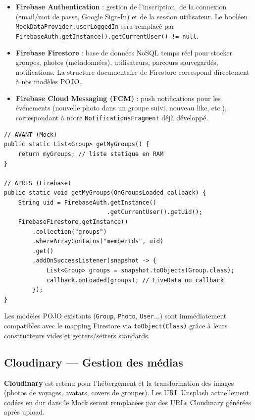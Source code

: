\documentclass[a4paper,11pt]{article}
\newenvironment{codeblock}{
    \par\noindent\minipage{\linewidth}\vspace{4pt}
}{
    \vspace{4pt}\endminipage\par
}
\begin{document}
\begin{itemize}[leftmargin=1.5em, itemsep=3pt]
    \item \textbf{Firebase Authentication} : gestion de l'inscription, de la connexion (email/mot de passe, Google Sign-In) et de la session utilisateur. Le booléen \texttt{MockDataProvider.userLoggedIn} sera remplacé par \texttt{FirebaseAuth.getInstance().getCurrentUser() != null}.
    \item \textbf{Firebase Firestore} : base de données NoSQL temps réel pour stocker groupes, photos (métadonnées), utilisateurs, parcours sauvegardés, notifications. La structure documentaire de Firestore correspond directement à nos modèles POJO.
    \item \textbf{Firebase Cloud Messaging (FCM)} : push notifications pour les événements (nouvelle photo dans un groupe suivi, nouveau like, etc.), correspondant à notre \texttt{NotificationsFragment} déjà développé.
\end{itemize}

\begin{codeblock}
\begin{lstlisting}[caption={Migration exemple — getMyGroups() vers Firestore}]
// AVANT (Mock)
public static List<Group> getMyGroups() {
    return myGroups; // liste statique en RAM
}

// APRES (Firebase)
public static void getMyGroups(OnGroupsLoaded callback) {
    String uid = FirebaseAuth.getInstance()
                             .getCurrentUser().getUid();
    FirebaseFirestore.getInstance()
        .collection("groups")
        .whereArrayContains("memberIds", uid)
        .get()
        .addOnSuccessListener(snapshot -> {
            List<Group> groups = snapshot.toObjects(Group.class);
            callback.onLoaded(groups); // LiveData ou callback
        });
}
\end{lstlisting}
\end{codeblock}

\noindent Les modèles POJO existants (\texttt{Group}, \texttt{Photo}, \texttt{User}...) sont immédiatement compatibles avec le mapping Firestore via \texttt{toObject(Class)} grâce à leurs constructeurs vides et getters/setters standards.

\subsection{Cloudinary — Gestion des médias}

\textbf{Cloudinary} est retenu pour l'hébergement et la transformation des images (photos de voyages, avatars, covers de groupes). Les URL Unsplash actuellement codées en dur dans le Mock seront remplacées par des URLs Cloudinary générées après upload.
\end{document}
